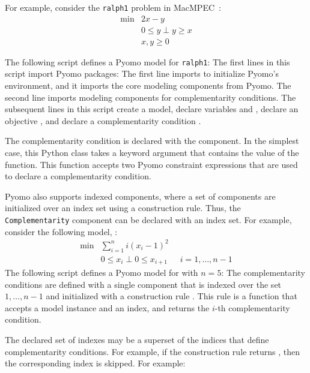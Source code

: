 For example, consider the \texttt{ralph1} problem in MacMPEC~\cite{MacMPEC}:
\[
\begin{array}{ll}
\min & 2 x - y\\
     & 0 \leq y \;\bot\; y \geq x\\
     & x,y \geq 0
\end{array}
\]

The following script defines a Pyomo model for \texttt{ralph1}:
The first lines in this script import Pyomo packages:
The first line imports  to initialize Pyomo's environment, and it
imports the core modeling components from Pyomo.  The 
second line imports modeling components for complementarity
conditions.
The subsequent lines in this script create a model, declare variables
 and , declare an objective , and
declare a complementarity condition .  
\fi

The complementarity condition is declared with the 
component.  In the simplest case, this Python class takes a keyword
argument  that contains the value of the 
function.  This function accepts two Pyomo constraint expressions
that are used to declare a complementarity condition.

Pyomo also supports indexed components, where a set of components
are initialized over an index set using a construction rule.
Thus, the \texttt{Complementarity} component can be declared
with an index set.  For example, consider the following model, :
\[
\begin{array}{lll}
\min & \sum_{i=1}^n i (x_i - 1)^2 &\\
     & 0 \leq x_i \;\bot\; 0 \leq x_{i+1} & \;\; i=1,\ldots,n-1
\end{array}
\]
The following script defines a Pyomo model for  with $n=5$:
The complementarity conditions are defined with a single
 component that is indexed over the set $1,
\ldots, n-1$ and initialized with a construction rule .
This rule is a function that accepts a model instance and an index,
and returns the $i$-th complementarity
condition.

The declared set of indexes may be a superset of the indices that define
complementarity conditions.
For example, if the construction rule returns , then the corresponding
index is skipped.  For example:

